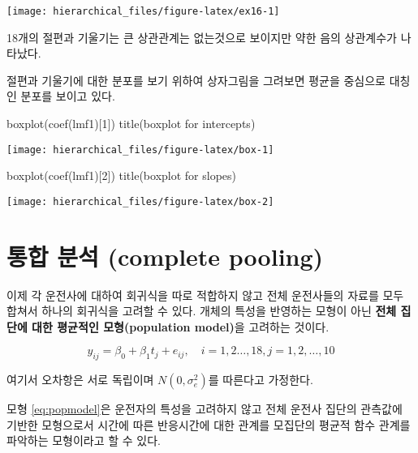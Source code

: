 \documentclass[
]{book}
\newenvironment{Shaded}{\begin{snugshade}}{\end{snugshade}}
\newcommand{\DecValTok}[1]{\textcolor[rgb]{0.00,0.00,0.81}{#1}}
\newcommand{\FunctionTok}[1]{\textcolor[rgb]{0.00,0.00,0.00}{#1}}
\newcommand{\NormalTok}[1]{#1}
\newcommand{\StringTok}[1]{\textcolor[rgb]{0.31,0.60,0.02}{#1}}
\begin{document}
\texttt{[image: hierarchical\_files/figure-latex/ex16-1]}

18개의 절편과 기울기는 큰 상관관계는 없는것으로 보이지만 약한 음의 상관계수가 나타났다.

절편과 기울기에 대한 분포를 보기 위하여 상자그림을 그려보면 평균을 중심으로 대칭인 분포를 보이고 있다.

\begin{Shaded}
\begin{Highlighting}[]
\FunctionTok{boxplot}\NormalTok{(}\FunctionTok{coef}\NormalTok{(lmf1)[}\DecValTok{1}\NormalTok{])}
\FunctionTok{title}\NormalTok{(}\StringTok{\textquotesingle{}boxplot for intercepts\textquotesingle{}}\NormalTok{)}
\end{Highlighting}
\end{Shaded}

\texttt{[image: hierarchical\_files/figure-latex/box-1]}

\begin{Shaded}
\begin{Highlighting}[]
\FunctionTok{boxplot}\NormalTok{(}\FunctionTok{coef}\NormalTok{(lmf1)[}\DecValTok{2}\NormalTok{])}
\FunctionTok{title}\NormalTok{(}\StringTok{\textquotesingle{}boxplot for slopes\textquotesingle{}}\NormalTok{)}
\end{Highlighting}
\end{Shaded}

\texttt{[image: hierarchical\_files/figure-latex/box-2]}

\hypertarget{uxd1b5uxd569-uxbd84uxc11d-complete-pooling}{%
\section{통합 분석 (complete pooling)}\label{uxd1b5uxd569-uxbd84uxc11d-complete-pooling}}

이제 각 운전사에 대하여 회귀식을 따로 적합하지 않고 전체 운전사들의 자료를 모두 합쳐서 하나의 회귀식을 고려할 수 있다. 개체의 특성을 반영하는 모형이 아닌 \textbf{전체 집단에 대한 평균적인 모형(population model)}을 고려하는 것이다.

\begin{equation} 
y_{ij} = \beta_0 + \beta_1 t_j + e_{ij} ,\quad i=1,2\dots,18,  j=1,2, \dots, 10 
\label{eq:popmodel}
\end{equation}

여기서 오차항은 서로 독립이며 \(N(0, \sigma^2_e)\)를 따른다고 가정한다.

모형 \eqref{eq:popmodel}은 운전자의 특성을 고려하지 않고 전체 운전사 집단의 관측값에 기반한 모형으로서 시간에 따른 반응시간에 대한 관계를 모집단의 평균적 함수 관계를 파악하는 모형이라고 할 수 있다.
\end{document}

